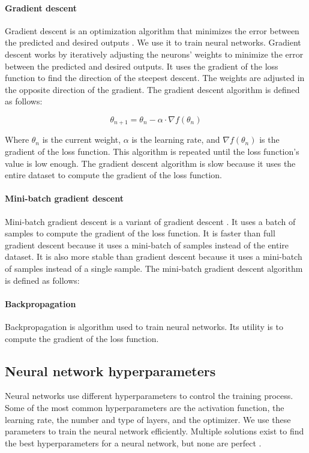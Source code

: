 \paragraph{Gradient descent}

Gradient descent is an optimization algorithm that minimizes the error between the predicted and desired outputs \cite{zhang2019gradient}. We use it to train neural networks. Gradient descent works by iteratively adjusting the neurons' weights to minimize the error between the predicted and desired outputs. It uses the gradient of the loss function to find the direction of the steepest descent. The weights are adjusted in the opposite direction of the gradient. The gradient descent algorithm is defined as follows:

\begin{equation}
    \theta_{n+1} = \theta_{n} - \alpha \cdot \nabla f(\theta_{n})
\end{equation}

Where $\theta_{n}$ is the current weight, $\alpha$ is the learning rate, and $\nabla f(\theta_{n})$ is the gradient of the loss function. This algorithm is repeated until the loss function's value is low enough. The gradient descent algorithm is slow because it uses the entire dataset to compute the gradient of the loss function.

\paragraph{Mini-batch gradient descent}

Mini-batch gradient descent is a variant of gradient descent \cite{8264077}. It uses a batch of samples to compute the gradient of the loss function. It is faster than full gradient descent because it uses a mini-batch of samples instead of the entire dataset. It is also more stable than gradient descent because it uses a mini-batch of samples instead of a single sample. The mini-batch gradient descent algorithm is defined as follows:

\paragraph{Backpropagation}

Backpropagation is algorithm used to train neural networks\cite{Sekhar}. Its utility is to compute the gradient of the loss function.

\subsection{Neural network hyperparameters}
Neural networks use different hyperparameters to control the training process. Some of the most common hyperparameters are the activation function, the learning rate, the number and type of layers, and the optimizer. We use these parameters to train the neural network efficiently. Multiple solutions exist to find the best hyperparameters for a neural network, but none are perfect \cite{yu2020hyperparameter}.

